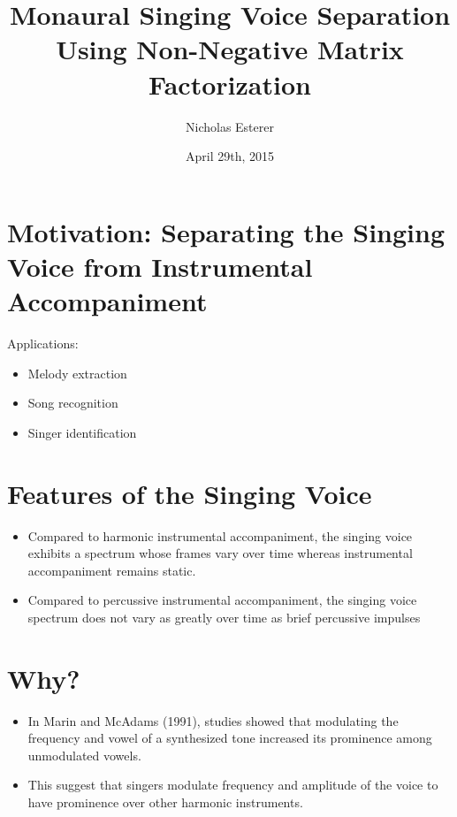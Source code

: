\documentclass[72pt]{article}
\begin{document}
\begin{Huge}
\title{Monaural Singing Voice Separation Using Non-Negative Matrix 
Factorization}
\date{April 29th, 2015}
\author{Nicholas Esterer}
\maketitle

\newpage

\section*{Motivation: Separating the Singing Voice from Instrumental
Accompaniment}
Applications:
\begin{itemize}
    \item Melody extraction
    \item Song recognition    
    \item Singer identification
\end{itemize}

\newpage

\section*{Features of the Singing Voice}
\begin{itemize}
    \item Compared to harmonic instrumental accompaniment, the singing voice
            exhibits a spectrum whose frames vary over time whereas instrumental
            accompaniment remains static.
    \item Compared to percussive instrumental accompaniment, the singing voice
            spectrum does not vary as greatly over time as brief percussive
            impulses
\end{itemize}

\newpage

\section*{Why?}
\begin{itemize}
    \item In Marin and McAdams (1991), studies showed that modulating the
            frequency and vowel of a synthesized tone increased its prominence
            among unmodulated vowels.
    \item This suggest that singers modulate frequency and amplitude of the
voice to have prominence over other harmonic instruments.
\end{itemize}


\end{Huge}
\end{document}
